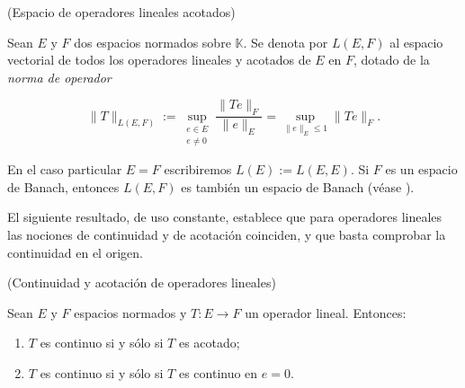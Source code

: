 \begin{Definicion}{(Espacio de operadores lineales acotados)}
\label{ch:preliminares:def:espacioOperadores}

Sean $E$ y $F$ dos espacios normados sobre $\mathbb{K}$. Se denota por $L(E, F)$
al espacio vectorial de todos los operadores lineales y acotados de $E$ en $F$,
dotado de la \textit{norma de operador}

\[\lVert T \rVert_{L(E, F)} := \sup_{\substack{e \in E \\ e \neq 0}} \frac{\lVert Te \rVert_F}{\lVert e \rVert_E} = \sup_{\lVert e \rVert_E \leq 1} \lVert Te \rVert_F.\]

En el caso particular $E = F$ escribiremos $L(E) := L(E, E)$. Si $F$ es un
espacio de Banach, entonces $L(E, F)$ es también un espacio de Banach
(véase \cite[Cap.~2]{brezis-2011-fun-ana-sob}).
\end{Definicion}

El siguiente resultado, de uso constante, establece que para operadores lineales
las nociones de continuidad y de acotación coinciden, y que basta comprobar la
continuidad en el origen.\\

\begin{Teorema}{(Continuidad y acotación de operadores lineales)}
\label{ch:preliminares:th:continuoAcotado}

Sean $E$ y $F$ espacios normados y $T : E \rightarrow F$ un operador lineal.
Entonces:

\begin{enumerate}
    \item $T$ es continuo si y sólo si $T$ es acotado;

    \item $T$ es continuo si y sólo si $T$ es continuo en $e = 0$.
\end{enumerate}
\end{Teorema}

